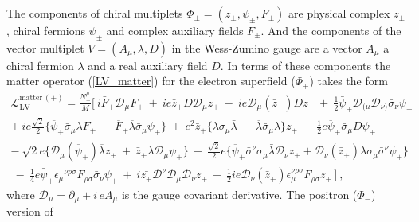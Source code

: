 \documentclass[12pt]{revtex4}
\begin{document}
The components of chiral multiplets 
$\Phi_\pm = (z_\pm, \psi_\pm, F_\pm)$ are physical complex $z_\pm$,
chiral fermions $\psi_\pm$ and complex auxiliary fields $F_\pm$. And
the components of the vector multiplet $V=(A_\mu,\lambda,D)$ in the
Wess-Zumino gauge are a vector $A_\mu$ a chiral fermion $\lambda$ and
a real auxiliary field $D$. In terms of these components the matter
operator (\ref{LV_matter}) for the electron superfield ($\Phi_+$)
takes the form 
\begin{gather}
\nonumber
  \mathcal{L}_{\mathrm{LV}}^{\mathrm{matter\,(+)}} 
 = \frac{N_+^\mu}{M} \Big[~
    i \bar{F}_+ \mathcal{D}_\mu F_+ ~+~
    i e \bar{z}_+ D \mathcal{D}_\mu z_+ ~-~
    i e \mathcal{D}_\mu(\bar{z}_+) D z_+ 
~+~ 
  \frac{1}{2}\bar{\psi}_+\mathcal{D}_{(\mu}\mathcal{D}_{\nu)}
               \bar{\sigma}_\nu \psi_+ 
\nonumber \\
  + ~ 
    i e \frac{\sqrt{2}}{2} \Big\{
               \overline{\psi}_+\bar\sigma_\mu\lambda F_+ 
       ~-~
               \overline{F}_+\overline{\lambda} \bar\sigma_\mu \psi_+
                         \Big\}  ~+~
    e^2 \bar{z}_+ \Big\{
               \lambda\sigma_\mu\bar{\lambda} 
       ~-~
               \overline{\lambda}\bar\sigma_\mu\lambda 
                       \Big\} z_+ 
~+~ 
    \frac{1}{2} e \overline{\psi}_+\bar\sigma_\mu D\psi_+
\nonumber \\
\nonumber
 -~ 
   \sqrt{2} e \Big\{ 
                     \mathcal{D}_\mu(\overline{\psi}_+)\overline{\lambda} z_+ 
     ~+~ 
                     \bar{z}_+ \lambda \mathcal{D}_\mu \psi_+ 
                     \Big\} 
    ~-~ 
    \frac{\sqrt{2}}{2} e \Big\{ 
                      \overline{\psi}_+\bar\sigma^\nu\sigma_\mu 
                     \bar{\lambda}\mathcal{D}_\nu z_+ +
                     \mathcal{D}_\nu(\bar{z}_+)\lambda\sigma_\mu
                     \bar{\sigma}^\nu \psi_+
                     \Big\}
   \\
  ~ -~
  \frac{1}{4} e \bar{\psi}_+\epsilon_\mu{}^{\nu\rho\sigma}
              F_{\rho\sigma} \bar{\sigma}_\nu \psi_+
   ~+~
  i \bar{z_+} \mathcal{D}^\nu \mathcal{D}_\mu \mathcal{D}_\nu z_+ 
   ~+~
   \frac{1}{2} i e \mathcal{D}_\nu (\bar{z}_+) \epsilon_\mu^{\nu\rho\sigma}
              F_{\rho\sigma} z_+ \, 
   \Big] ~,
\label{LV_electron_comp}
\end{gather}
where $ \mathcal{D}_\mu = \partial_\mu + i\, e A_\mu$ is  the gauge
covariant derivative.  The positron ($\Phi_-$) version of
\end{document}
